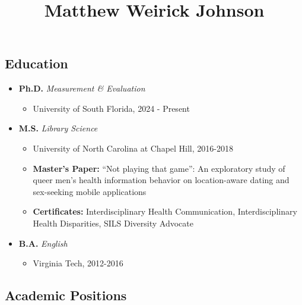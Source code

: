 \documentclass[
  letterpaper,
  DIV=11,
  numbers=noendperiod]{scrartcl}
\title{Matthew Weirick Johnson}
\author{}
\date{}
\providecommand{\tightlist}{%
  \setlength{\itemsep}{0pt}\setlength{\parskip}{0pt}}\usepackage{longtable,booktabs,array}
\begin{document}
\maketitle

\subsection{\texorpdfstring{ Education}{ Education}}\label{education}

\begin{itemize}
\tightlist
\item
  \textbf{Ph.D.} \emph{Measurement \& Evaluation}

  \begin{itemize}
  \tightlist
  \item
    University of South Florida, 2024 - Present
  \end{itemize}
\item
  \textbf{M.S.} \emph{Library Science}

  \begin{itemize}
  \tightlist
  \item
    University of North Carolina at Chapel Hill, 2016-2018
  \item
    \textbf{Master's Paper:} ``Not playing that game'': An exploratory
    study of queer men's health information behavior on location-aware
    dating and sex-seeking mobile applications
  \item
    \textbf{Certificates:} Interdisciplinary Health Communication,
    Interdisciplinary Health Disparities, SILS Diversity Advocate
  \end{itemize}
\end{itemize}

\begin{itemize}
\tightlist
\item
  \textbf{B.A.} \emph{English}

  \begin{itemize}
  \tightlist
  \item
    Virginia Tech, 2012-2016
  \end{itemize}
\end{itemize}

\subsection{\texorpdfstring{ Academic
Positions}{ Academic Positions}}\label{academic-positions}
\end{document}
